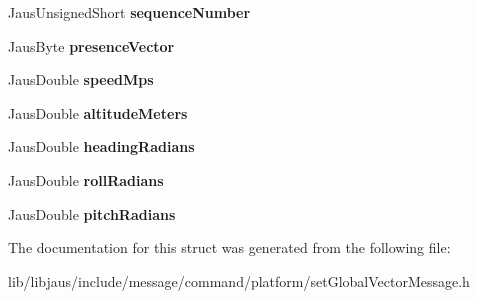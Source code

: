 \begin{DoxyCompactItemize}
\item 
\hypertarget{struct_set_global_vector_message_struct_af23c17dca45355e5f56891ccfb270e50}{\-Jaus\-Unsigned\-Short {\bfseries sequence\-Number}}\label{struct_set_global_vector_message_struct_af23c17dca45355e5f56891ccfb270e50}

\item 
\hypertarget{struct_set_global_vector_message_struct_adb482448fe01354ad1cfa2c099751e88}{\-Jaus\-Byte {\bfseries presence\-Vector}}\label{struct_set_global_vector_message_struct_adb482448fe01354ad1cfa2c099751e88}

\item 
\hypertarget{struct_set_global_vector_message_struct_ab005769dca96e77ebe9fb24a74025dc1}{\-Jaus\-Double {\bfseries speed\-Mps}}\label{struct_set_global_vector_message_struct_ab005769dca96e77ebe9fb24a74025dc1}

\item 
\hypertarget{struct_set_global_vector_message_struct_a10aa9899c0698e332323f44d942a4062}{\-Jaus\-Double {\bfseries altitude\-Meters}}\label{struct_set_global_vector_message_struct_a10aa9899c0698e332323f44d942a4062}

\item 
\hypertarget{struct_set_global_vector_message_struct_a628b765f7be4d2ebeedc73f6bceab214}{\-Jaus\-Double {\bfseries heading\-Radians}}\label{struct_set_global_vector_message_struct_a628b765f7be4d2ebeedc73f6bceab214}

\item 
\hypertarget{struct_set_global_vector_message_struct_a3d02d6392180fd7f45b0628c2b10f0e9}{\-Jaus\-Double {\bfseries roll\-Radians}}\label{struct_set_global_vector_message_struct_a3d02d6392180fd7f45b0628c2b10f0e9}

\item 
\hypertarget{struct_set_global_vector_message_struct_a79a3a002d0892d3b7028d6c736f5eaf7}{\-Jaus\-Double {\bfseries pitch\-Radians}}\label{struct_set_global_vector_message_struct_a79a3a002d0892d3b7028d6c736f5eaf7}

\end{DoxyCompactItemize}


\-The documentation for this struct was generated from the following file\-:\begin{DoxyCompactItemize}
\item 
lib/libjaus/include/message/command/platform/set\-Global\-Vector\-Message.\-h\end{DoxyCompactItemize}
